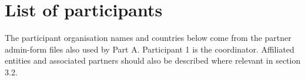 \section*{List of participants}
\begin{heguidance}
The participant organisation names and countries below come from the partner
admin-form files also used by Part A. Participant 1 is the coordinator.
Affiliated entities and associated partners should also be described where relevant
in section 3.2.
\end{heguidance}
\HEPrintParticipantList

